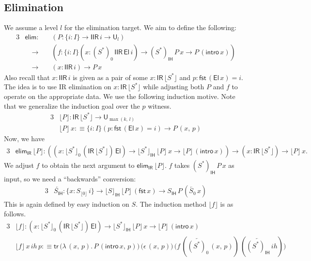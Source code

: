 \documentclass[acmsmall,screen,review,anonymous]{acmart}
\newcommand{\msf}[1]{{\mathsf{#1}}}
\newcommand{\U}{\msf{U}}
\newcommand{\El}{\msf{El}}
\newcommand{\IR}{\msf{IR}}
\newcommand{\ih}{{ih}}
\newcommand{\intro}{\msf{intro}}
\newcommand{\IH}{\msf{IH}}
\newcommand{\elim}{\msf{elim}}
\newcommand{\tr}{\msf{tr}}
\newcommand{\fst}{\msf{fst}}
\newcommand{\IIR}{\msf{IIR}}
\newcommand{\floord}[1]{\lfloor #1 \rfloor}
\newcommand{\ola}[1]{\overleftarrow{#1}}
\begin{document}
\subsection{Elimination}\label{sec:iir-construction-elimination}

We assume a level $l$ for the elimination target. We aim to define the following:
\begin{alignat*}{3}
  &\elim :\,           &&(P : \{i : I\}\to \IIR\,i \to \U_l)\\
  &                \quad\to && (f : \{i : I\}(x : (S^*)_0\,\IIR\,\El\,i) \to (S^*)_\IH\,P\,x \to P\,(\intro\,x))\\
  &                \quad\to && (x : \IIR\,i) \to P\,x
\end{alignat*}
Also recall that $x : \IIR\,i$ is given as a pair of some $x : \IR\,\floord{S^*}$ and $p :
\fst\,(\El\,x) = i$.  The idea is to use IR elimination on $x : \IR\,\floord{S^*}$ while adjusting
both $P$ and $f$ to operate on the appropriate data. We use the following induction motive. Note
that we generalize the induction goal over the $p$ witness.
\begin{alignat*}{3}
  &\floord{P} : \IR\,\floord{S^*} \to \U_{\max(k,\,l)} \\
  &\floord{P}\,x :\equiv \{i : I\}(p : \fst\,(\El\,x) = i) \to P\,(x,\,p)
\end{alignat*}
Now, we have
\begin{alignat*}{3}
  & \elim_\IR\,\floord{P} : ((x : \floord{S^*}_0\,(\IR\,\floord{S^*})\,\El) \to \floord{S^*}_\IH\,\floord{P}\,x \to \floord{P}\,(\intro\,x))
       \to (x : \IR\,\floord{S^*}) \to \floord{P}\,x.
\end{alignat*}
We adjust $f$ to obtain the next argument to $\elim_\IR\,\floord{P}$. $f$ takes $(S^*)_\IH\,P\,x$ as input,
so we need a ``backwards'' conversion:
\begin{alignat*}{3}
  & \ola{S_\IH} : \{x : S_{\floord{0}}\,i\} \to \floord{S}_\IH\,\floord{P}\,(\fst\,x) \to S_\IH\,P\,(\ola{S_0}\,x)
\end{alignat*}
This is again defined by easy induction on $S$. The induction method $\floord{f}$ is as follows.
\begin{alignat*}{3}
  &\floord{f} : (x : \floord{S^*}_0\,(\IR\,\floord{S^*})\,\El) \to \floord{S^*}_\IH\,\floord{P}\,x \to \floord{P}\,(\intro\,x)\\
  &\floord{f}\,x\,\ih\,p :\equiv \tr\,\bigl(\lambda\,(x,\,p).\,P\,(\intro\,x,\,p)\bigr)\,\bigl(\epsilon\,(x,\,p)\bigr)\,
                                      \bigl(f\,(\ola{(S^*)_0}\,(x,\,p))\,(\ola{(S^*)_\IH}\,\ih)\bigr)
\end{alignat*}
\end{document}
